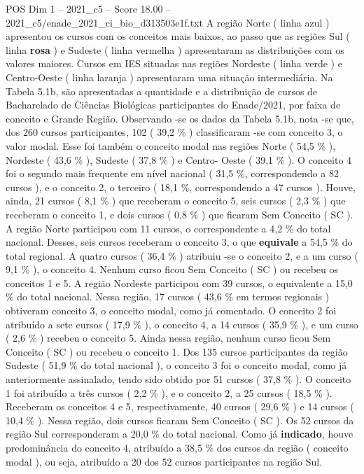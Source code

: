 \begin{textsample}{POS Dim 1 – 2021\_c5 – Score 18.00 – 2021\_c5/enade\_2021\_ci\_bio\_d313503e1f.txt}
A região Norte ( linha azul ) apresentou os cursos com os conceitos mais baixos, ao passo que as regiões Sul ( linha \textbf{rosa} ) e Sudeste ( linha vermelha ) apresentaram as distribuições com os valores maiores.
Cursos em IES situadas nas regiões Nordeste ( linha verde ) e Centro-Oeste ( linha laranja ) apresentaram uma situação intermediária.
Na Tabela 5.1b, são apresentadas a quantidade e a distribuição de cursos de Bacharelado de Ciências Biológicas participantes do Enade/2021, por faixa de conceito e Grande Região.
Observando -se os dados da Tabela 5.1b, nota -se que, dos 260 cursos participantes, 102 ( 39,2 \% ) classificaram -se com conceito 3, o valor modal.
Esse foi também o conceito modal nas regiões Norte ( 54,5 \% ), Nordeste ( 43,6 \% ), Sudeste ( 37,8 \% ) e Centro- Oeste ( 39,1 \% ).
O conceito 4 foi o segundo mais frequente em nível nacional ( 31,5 \%, correspondendo a 82 cursos ), e o conceito 2, o terceiro ( 18,1 \%, correspondendo a 47 cursos ).
Houve, ainda, 21 cursos ( 8,1 \% ) que receberam o conceito 5, seis cursos ( 2,3 \% ) que receberam o conceito 1, e dois cursos ( 0,8 \% ) que ficaram Sem Conceito ( SC ).
A região Norte participou com 11 cursos, o correspondente a 4,2 \% do total nacional.
Desses, seis cursos receberam o conceito 3, o que \textbf{equivale} a 54,5 \% do total regional.
A quatro cursos ( 36,4 \% ) atribuiu -se o conceito 2, e a um curso ( 9,1 \% ), o conceito 4.
Nenhum curso ficou Sem Conceito ( SC ) ou recebeu os conceitos 1 e 5.
A região Nordeste participou com 39 cursos, o equivalente a 15,0 \% do total nacional.
Nessa região, 17 cursos ( 43,6 \% em termos regionais ) obtiveram conceito 3, o conceito modal, como já comentado.
O conceito 2 foi atribuído a sete cursos ( 17,9 \% ), o conceito 4, a 14 cursos ( 35,9 \% ), e um curso ( 2,6 \% ) recebeu o conceito 5.
Ainda nessa região, nenhum curso ficou Sem Conceito ( SC ) ou recebeu o conceito 1.
Dos 135 cursos participantes da região Sudeste ( 51,9 \% do total nacional ), o conceito 3 foi o conceito modal, como já anteriormente assinalado, tendo sido obtido por 51 cursos ( 37,8 \% ).
O conceito 1 foi atribuído a três cursos ( 2,2 \% ), e o conceito 2, a 25 cursos ( 18,5 \% ).
Receberam os conceitos 4 e 5, respectivamente, 40 cursos ( 29,6 \% ) e 14 cursos ( 10,4 \% ).
Nessa região, dois cursos ficaram Sem Conceito ( SC ).
Os 52 cursos da região Sul corresponderam a 20,0 \% do total nacional.
Como já \textbf{indicado}, houve predominância do conceito 4, atribuído a 38,5 \% dos cursos da região ( conceito modal ), ou seja, atribuído a 20 dos 52 cursos participantes na região Sul.

\end{textsample}
